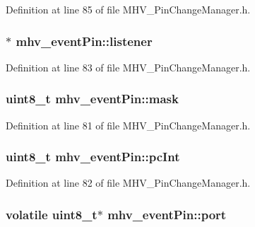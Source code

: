 \-Definition at line 85 of file \-M\-H\-V\-\_\-\-Pin\-Change\-Manager.\-h.

\hypertarget{structmhv__event_pin_a90fdc2fdc188f1b614a41b45a7f6ba6c}{
\subsubsection[{listener}]{$\ast$ {\bf mhv\-\_\-event\-Pin\-::listener}}}
\label{structmhv__event_pin_a90fdc2fdc188f1b614a41b45a7f6ba6c}


\-Definition at line 83 of file \-M\-H\-V\-\_\-\-Pin\-Change\-Manager.\-h.

\hypertarget{structmhv__event_pin_a28a7cf2eb643ead207ce1e1c4dcab533}{
\subsubsection[{mask}]{\setlength{\rightskip}{0pt plus 5cm}uint8\-\_\-t {\bf mhv\-\_\-event\-Pin\-::mask}}}
\label{structmhv__event_pin_a28a7cf2eb643ead207ce1e1c4dcab533}


\-Definition at line 81 of file \-M\-H\-V\-\_\-\-Pin\-Change\-Manager.\-h.

\hypertarget{structmhv__event_pin_a94d11da6ceacb80c9c2f30edbe99bd0e}{
\subsubsection[{pc\-Int}]{\setlength{\rightskip}{0pt plus 5cm}uint8\-\_\-t {\bf mhv\-\_\-event\-Pin\-::pc\-Int}}}
\label{structmhv__event_pin_a94d11da6ceacb80c9c2f30edbe99bd0e}


\-Definition at line 82 of file \-M\-H\-V\-\_\-\-Pin\-Change\-Manager.\-h.

\hypertarget{structmhv__event_pin_a582f202dfe1a27124cfea3776a65c9e2}{
\subsubsection[{port}]{\setlength{\rightskip}{0pt plus 5cm}volatile uint8\-\_\-t$\ast$ {\bf mhv\-\_\-event\-Pin\-::port}}}
\label{structmhv__event_pin_a582f202dfe1a27124cfea3776a65c9e2}


